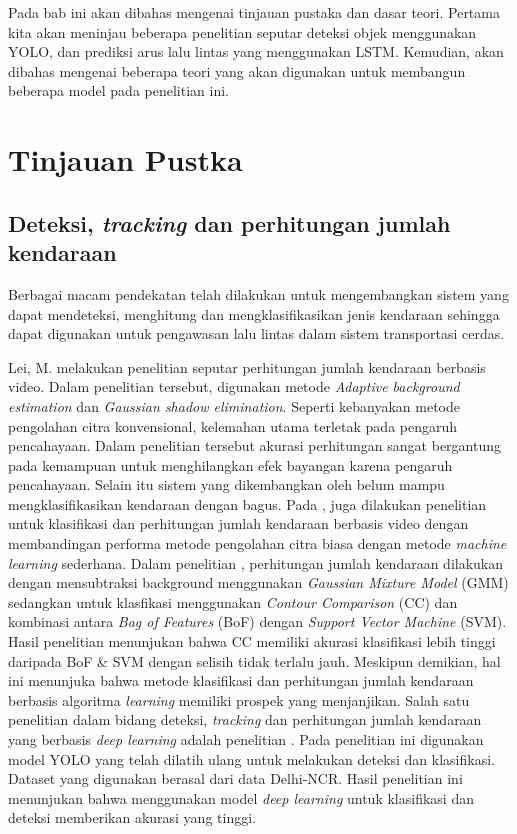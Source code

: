 \documentclass[../thesis.tex]{subfiles}
\begin{document}
   

Pada bab ini akan dibahas mengenai tinjauan pustaka dan dasar teori. Pertama kita akan meninjau beberapa penelitian seputar deteksi objek menggunakan YOLO, dan prediksi arus lalu lintas yang menggunakan LSTM.
Kemudian, akan dibahas mengenai beberapa teori yang akan digunakan untuk membangun beberapa model pada penelitian ini.

\section{Tinjauan Pustka}
\subsection{Deteksi, \textit{tracking} dan perhitungan jumlah kendaraan}
Berbagai macam pendekatan telah dilakukan untuk mengembangkan sistem yang dapat mendeteksi, menghitung dan mengklasifikasikan jenis kendaraan sehingga dapat digunakan untuk pengawasan lalu lintas dalam sistem transportasi cerdas.

Lei, M. melakukan penelitian seputar perhitungan jumlah kendaraan berbasis video. Dalam penelitian tersebut, digunakan metode \textit{Adaptive background estimation} dan \textit{Gaussian shadow elimination}. Seperti kebanyakan metode pengolahan citra konvensional, kelemahan utama terletak pada pengaruh pencahayaan. Dalam penelitian tersebut akurasi perhitungan
sangat bergantung pada kemampuan untuk menghilangkan efek bayangan karena pengaruh pencahayaan. Selain itu sistem yang dikembangkan oleh \cite{Lei2018VehicleCounting} belum mampu mengklasifikasikan kendaraan dengan bagus.
Pada \cite{Sheeraz2018VehicleDetection}, juga dilakukan penelitian untuk klasifikasi dan perhitungan jumlah kendaraan berbasis video dengan membandingan performa metode pengolahan citra biasa dengan metode \textit{machine learning} sederhana. Dalam penelitian \cite{Sheeraz2018VehicleDetection}, perhitungan jumlah kendaraan dilakukan dengan mensubtraksi background menggunakan \textit{Gaussian Mixture Model} (GMM) sedangkan untuk klasfikasi menggunakan \textit{Contour Comparison} (CC) dan kombinasi antara \textit{Bag of Features}
(BoF) dengan \textit{Support Vector Machine} (SVM). Hasil penelitian menunjukan bahwa CC memiliki akurasi klasifikasi lebih tinggi daripada BoF \& SVM dengan selisih tidak terlalu jauh. 
Meskipun demikian, hal ini menunjuka bahwa metode klasifikasi dan perhitungan jumlah kendaraan berbasis algoritma \textit{learning} memiliki prospek yang menjanjikan.
Salah satu penelitian dalam bidang deteksi, \textit{tracking} dan perhitungan jumlah kendaraan yang berbasis \textit{deep learning} adalah penelitian \cite{Chaucan2019CNN}. Pada penelitian ini digunakan model YOLO yang telah dilatih ulang untuk melakukan deteksi dan klasifikasi. Dataset yang digunakan berasal dari data Delhi-NCR. Hasil penelitian ini menunjukan bahwa menggunakan model \textit{deep learning} untuk klasifikasi dan deteksi memberikan akurasi yang tinggi.  
\end{document}
